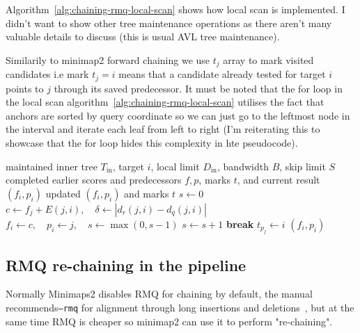 Algorithm~\ref{alg:chaining-rmq-local-scan} shows how local scan is implemented.
I didn't want to show other tree maintenance operations as there aren't many valuable details to discuss (this is usual AVL tree maintenance).

Similarily to minimap2 forward chaining we use $t_j$ array to mark visited candidates i.e  mark \(t_j=i\) means that a candidate already tested for target \(i\)
points to \(j\) through its saved predecessor. It must be noted that the for loop in the local scan algorithm~\ref{alg:chaining-rmq-local-scan} utilises the fact that anchors are sorted by query coordinate so we can just go to the leftmost node in the interval and iterate each leaf from left to right (I'm reiterating this to showcase that the for loop hides this complexity in hte pseudocode).

\begin{algorithm}[H]
\caption{Minimap2 local scan after the primary RMQ query}
\label{alg:chaining-rmq-local-scan}
\footnotesize
\begin{algorithmic}[1]
  \Require maintained inner tree \(T_{\mathrm{in}}\), target \(i\),
    local limit \(D_{\mathrm{in}}\), bandwidth \(B\), skip limit \(S\)
  \Require completed earlier scores and predecessors \(f,p\), marks \(t\),
    and current result \((f_i,p_i)\)
  \Ensure updated \((f_i,p_i)\) and marks \(t\)
    \State \(s\gets0\)
      \State \(c\gets f_j+E(j,i),\quad
        \delta\gets|d_r(j,i)-d_q(j,i)|\)
          \State \(f_i\gets c,\quad p_i\gets j,\quad s\gets\max(0,s-1)\)
          \State \(s\gets s+1\)
            \State \textbf{break}
          \EndIf
        \EndIf
          \State \(t_{p_j}\gets i\)
        \EndIf
      \EndIf
    \EndFor
    \State \Return \((f_i,p_i)\)
  \EndFunction
\end{algorithmic}
\end{algorithm}


\subsection{RMQ re-chaining in the pipeline}
\label{sec:chaining-rmq-rechaining}

Normally Minimaps2 disables RMQ for chaining by default, the manual recommends\texttt{--rmq} for alignment through
long insertions and deletions~\cite{minimap2_rmq_manual}, but at the same time RMQ is cheaper so minimap2 can use it to perform "re-chaining". 

